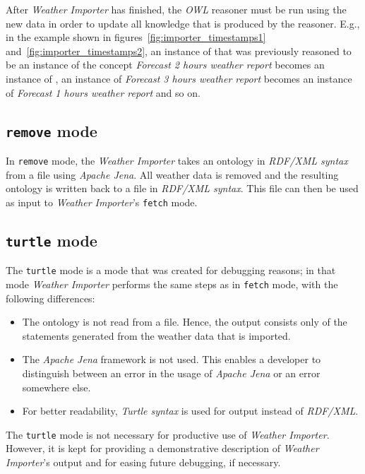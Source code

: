 After \emph{Weather Importer} has finished, the \emph{OWL} reasoner must be run using the new data in order to update all knowledge that is produced by the reasoner. E.g., in the example shown in figures~\ref{fig:importer_timestamps1} and~\ref{fig:importer_timestamps2}, an instance of  that was previously reasoned to be an instance of the concept \emph{Forecast 2 hours weather report} becomes an instance of , an instance of \emph{Forecast 3 hours weather report} becomes an instance of \emph{Forecast 1 hours weather report} and so on.

\subsection{\texttt{remove} mode}

In \texttt{remove} mode, the \emph{Weather Importer} takes an ontology in \emph{RDF/XML syntax} from a file using \emph{Apache Jena}. All weather data is removed and the resulting ontology is written back to a file in \emph{RDF/XML syntax}. This file can then be used as input to \emph{Weather Importer}'s \texttt{fetch} mode.

\subsection{\texttt{turtle} mode}
\label{subsec:importer_turtle}

The \texttt{turtle} mode is a mode that was created for debugging reasons; in that mode \emph{Weather Importer} performs the same steps as in \texttt{fetch} mode, with the following differences:
\begin{itemize}
  \item The \thinkhomeweather ontology is not read from a file. Hence, the output consists only of the statements generated from the weather data that is imported.
  \item The \emph{Apache Jena} framework is not used. This enables a developer to distinguish between an error in the usage of \emph{Apache Jena} or an error somewhere else.
  \item For better readability, \emph{Turtle syntax} is used for output instead of \emph{RDF/XML}.
\end{itemize}

The \texttt{turtle} mode is not necessary for productive use of \emph{Weather Importer}. However, it is kept for providing a demonstrative description of \emph{Weather Importer}'s output and for easing future debugging, if necessary.

